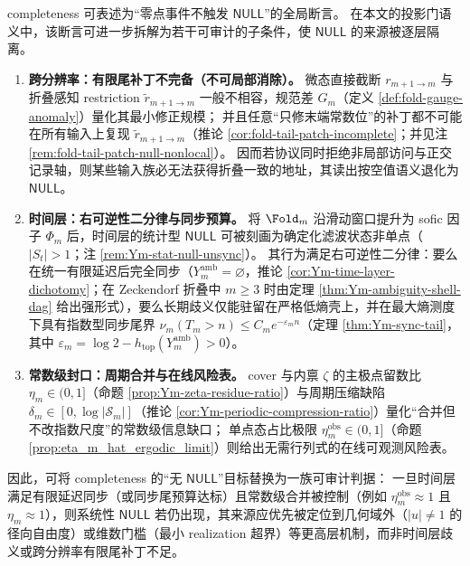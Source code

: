 \begin{remark}\label{rem:xi-completeness-auditable-decomposition}
completeness 可表述为“零点事件不触发 \(\mathsf{NULL}\)”的全局断言。
在本文的投影门语义中，该断言可进一步拆解为若干可审计的子条件，使 \(\mathsf{NULL}\) 的来源被逐层隔离。
\begin{enumerate}
  \item \textbf{跨分辨率：有限尾补丁不完备（不可局部消除）。}
  微态直接截断 \(r_{m+1\to m}\) 与折叠感知 restriction \(\widetilde r_{m+1\to m}\) 一般不相容，规范差 \(G_m\)（定义 \ref{def:fold-gauge-anomaly}）量化其最小修正规模；
  并且任意“只修末端常数位”的补丁都不可能在所有输入上复现 \(\widetilde r_{m+1\to m}\)（推论 \ref{cor:fold-tail-patch-incomplete}；并见注 \ref{rem:fold-tail-patch-null-nonlocal}）。
  因而若协议同时拒绝非局部访问与正交记录轴，则某些输入族必无法获得折叠一致的地址，其读出按空值语义退化为 \(\mathsf{NULL}\)。

  \item \textbf{时间层：右可逆性二分律与同步预算。}
  将 \(\Fold_m\) 沿滑动窗口提升为 sofic 因子 \(\Phi_m\) 后，时间层的统计型 \(\mathsf{NULL}\) 可被刻画为确定化滤波状态非单点（\(|S_t|>1\)；注 \ref{rem:Ym-stat-null-unsync}）。
  其行为满足右可逆性二分律：要么在统一有限延迟后完全同步（\(Y_m^{\mathrm{amb}}=\varnothing\)，推论 \ref{cor:Ym-time-layer-dichotomy}；在 Zeckendorf 折叠中 \(m\ge 3\) 时由定理 \ref{thm:Ym-ambiguity-shell-dag} 给出强形式），要么长期歧义仅能驻留在严格低熵壳上，并在最大熵测度下具有指数型同步尾界 \(\nu_m(T_m>n)\le C_m e^{-\varepsilon_m n}\)（定理 \ref{thm:Ym-sync-tail}，其中 \(\varepsilon_m=\log 2-h_{\mathrm{top}}(Y_m^{\mathrm{amb}})>0\)）。

  \item \textbf{常数级封口：周期合并与在线风险表。}
  cover 与内禀 \(\zeta\) 的主极点留数比 \(\eta_m\in(0,1]\)（命题 \ref{prop:Ym-zeta-residue-ratio}）与周期压缩缺陷 \(\delta_m\in[0,\log|\mathcal{S}_m|]\)（推论 \ref{cor:Ym-periodic-compression-ratio}）量化“合并但不改指数尺度”的常数级信息缺口；
  单点态占比极限 \(\eta_m^{\mathrm{obs}}\in(0,1]\)（命题 \ref{prop:eta_m_hat_ergodic_limit}）则给出无需行列式的在线可观测风险表。
\end{enumerate}
\par
因此，可将 completeness 的“无 \(\mathsf{NULL}\)”目标替换为一族可审计判据：
一旦时间层满足有限延迟同步（或同步尾预算达标）且常数级合并被控制（例如 \(\eta_m^{\mathrm{obs}}\approx 1\) 且 \(\eta_m\approx 1\)），则系统性 \(\mathsf{NULL}\) 若仍出现，其来源应优先被定位到几何域外（\(|u|\neq 1\) 的径向自由度）或维数门槛（最小 realization 超界）等更高层机制，而非时间层歧义或跨分辨率有限尾补丁不足。
\end{remark}

